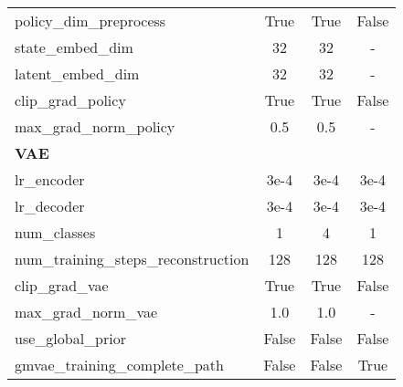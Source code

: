 \documentclass[letterpaper]{article} %
\begin{document}
\begin{table*}[t]
\begin{tabular}{lccc}
    policy\_dim\_preprocess & True    & True    & False\\
    state\_embed\_dim & 32    & 32    & -\\
    latent\_embed\_dim & 32    & 32    & -\\
    clip\_grad\_policy & True    & True    & False\\
    max\_grad\_norm\_policy & 0.5   & 0.5   & -\\
    \midrule
    \textbf{VAE} &       &       &  \\
    \midrule
    lr\_encoder & 3e-4 & 3e-4 & 3e-4 \\
    lr\_decoder & 3e-4 & 3e-4 & 3e-4 \\
    num\_classes & 1     & 4     & 1 \\
    num\_training\_steps\_reconstruction & 128   & 128   & 128 \\
    clip\_grad\_vae & True    & True    & False\\
    max\_grad\_norm\_vae & 1.0     & 1.0     & -\\
    use\_global\_prior & False    & False    & False\\
    gmvae\_training\_complete\_path & False    & False    & True\\
    \bottomrule
    \end{tabular}%
  \label{tab:ood-tasks}%
\end{table*}%
\end{document}
